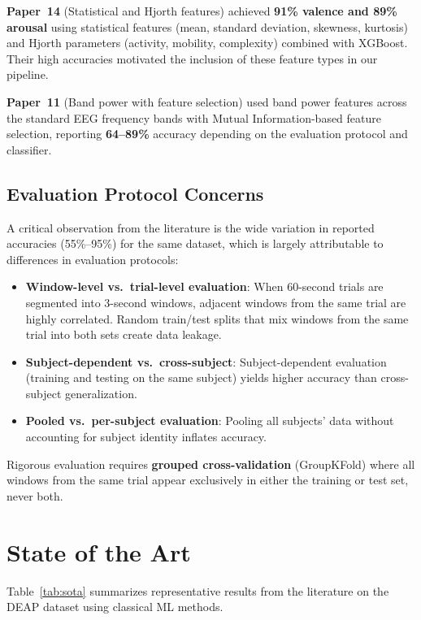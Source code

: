 \documentclass[12pt,a4paper]{report}
\begin{document}
\textbf{Paper~14} (Statistical and Hjorth features) achieved \textbf{91\%
valence and 89\% arousal} using statistical features (mean, standard deviation,
skewness, kurtosis) and Hjorth parameters (activity, mobility, complexity)
combined with XGBoost. Their high accuracies motivated the inclusion of these
feature types in our pipeline.

\textbf{Paper~11} (Band power with feature selection) used band power features
across the standard EEG frequency bands with Mutual Information-based feature
selection, reporting \textbf{64--89\%} accuracy depending on the evaluation
protocol and classifier.

\subsection{Evaluation Protocol Concerns}

A critical observation from the literature is the wide variation in reported
accuracies (55\%--95\%) for the same dataset, which is largely attributable to
differences in evaluation protocols:

\begin{itemize}[noitemsep]
    \item \textbf{Window-level vs.\ trial-level evaluation}: When 60-second
          trials are segmented into 3-second windows, adjacent windows from the
          same trial are highly correlated. Random train/test splits that mix
          windows from the same trial into both sets create data leakage.
    \item \textbf{Subject-dependent vs.\ cross-subject}: Subject-dependent
          evaluation (training and testing on the same subject) yields higher
          accuracy than cross-subject generalization.
    \item \textbf{Pooled vs.\ per-subject evaluation}: Pooling all subjects'
          data without accounting for subject identity inflates accuracy.
\end{itemize}

Rigorous evaluation requires \textbf{grouped cross-validation} (GroupKFold)
where all windows from the same trial appear exclusively in either the training
or test set, never both.


\section{State of the Art}
\label{sec:sota}

Table~\ref{tab:sota} summarizes representative results from the literature on
the DEAP dataset using classical ML methods.
\end{document}
